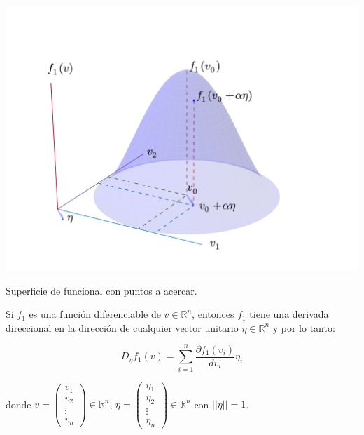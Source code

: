                 \begin{marginfigure}
                    \centering
                    \includegraphics[width=\textwidth]{./imagenes/superficie3d.pdf}
                    \caption{\label{fig:superficie3d}Superficie de funcional con puntos a acercar.}
                \end{marginfigure}

                \begin{teorema}
                    Si $f_1$ es una función diferenciable de $v \in \mathbb{R}^n$, entonces $f_1$ tiene una derivada direccional en la dirección de cualquier vector unitario $\eta \in \mathbb{R}^n$ y por lo tanto:

                    \begin{equation}
                        D_{\eta} f_1(v) = \sum_{i=1}^n \frac{\partial f_1(v_i)}{dv_i} \eta_i
                    \end{equation}

                    donde $v = \begin{pmatrix} v_1 \\ v_2 \\ \vdots \\ v_n \end{pmatrix} \in \mathbb{R}^n$, $\eta = \begin{pmatrix} \eta_1 \\ \eta_2 \\ \vdots \\ \eta_n \end{pmatrix} \in \mathbb{R}^n$ con $|| \eta || = 1$.
                \end{teorema}


